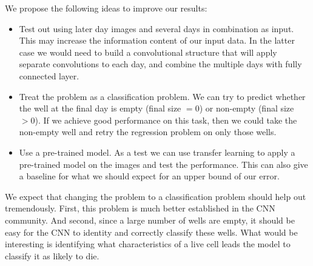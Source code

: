 \documentclass[10pt,twocolumn,letterpaper]{article}
\begin{document}
We propose the following ideas to improve our results:
\begin{itemize}
\item Test out using later day images and several days in combination as input.  This may increase the information content of our input data.  In the latter case we would need to build a convolutional structure that will apply separate convolutions to each day, and combine the multiple days with fully connected layer.
\item Treat the problem as a classification problem.  We can try to predict whether the well at the final day is empty (final size $= 0$) or non-empty (final size $> 0$).  If we achieve good performance on this task, then we could take the non-empty well and retry the regression problem on only those wells.
\item Use a pre-trained model.  As a test we can use transfer learning to apply a pre-trained model on the images and test the performance.  This can also give a baseline for what we should expect for an upper bound of our error.
\end{itemize}

We expect that changing the problem to a classification problem should help out tremendously.  First, this problem is much better established in the CNN community.  And second, since a large number of wells are empty, it should be easy for the CNN to identity and correctly classify these wells.    What would be interesting is identifying what characteristics of a live cell leads the model to classify it as likely to die.  

{\small


}
\end{document}
